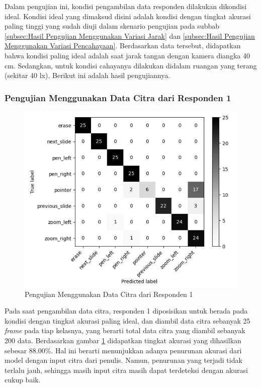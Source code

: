 Dalam pengujian ini, kondisi pengambilan data responden dilakukan dikondisi ideal. Kondisi ideal yang dimaksud disini adalah kondisi dengan tingkat akurasi paling tinggi yang sudah diuji dalam skenario pengujian pada subbab \ref{subsec:Hasil Pengujian Menggunakan Variasi Jarak} dan \ref{subsec:Hasil Pengujian Menggunakan Variasi Pencahayaan}. Berdasarkan data tersebut, didapatkan bahwa kondisi paling ideal adalah saat jarak tangan dengan kamera diangka 40 cm. Sedangkan, untuk kondisi cahayanya dilakukan didalam ruangan yang terang (sekitar 40 lx). Berikut ini adalah hasil pengujiannya.

\subsubsection{Pengujian Menggunakan Data Citra dari Responden 1}
\label{subsec:Pengujian Menggunakan Data Citra dari Responden 1}

\begin{figure}[!htb]
  \centering
  \includegraphics[scale=0.55]{gambar/pengujian-ukuran-tangan/tangan-alfan.png}
  \caption{Pengujian Menggunakan Data Citra dari Responden 1}
  \label{fig:Pengujian Menggunakan Data Citra dari Responden 1}
\end{figure}

Pada saat pengambilan data citra, responden 1 diposisikan untuk berada pada kondisi dengan tingkat akurasi paling ideal, dan diambil data citra sebanyak 25 \emph{frame} pada tiap kelasnya, yang berarti total data citra yang diambil sebanyak 200 data. Berdasarkan gambar \ref{fig:Pengujian Menggunakan Data Citra dari Responden 1} didapatkan tingkat akurasi yang dihasilkan sebesar 88.00\%. Hal ini berarti menunjukkan adanya penurunan akurasi dari model dengan input citra dari penulis. Namun, penurunan yang terjadi tidak terlalu jauh, sehingga masih input citra masih dapat terdeteksi dengan akurasi cukup baik. 

